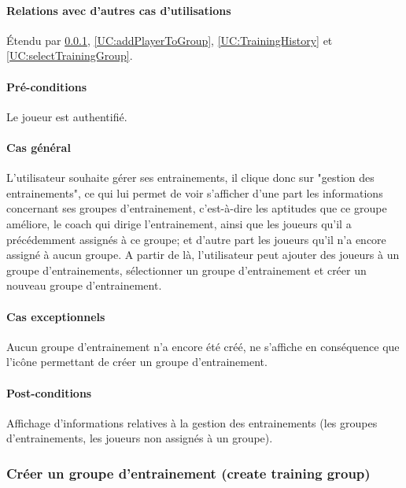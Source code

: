 \paragraph{Relations avec d'autres cas d'utilisations}
Étendu par \ref{UC:createTraining}, \ref{UC:addPlayerToGroup}, \ref{UC:TrainingHistory} et \ref{UC:selectTrainingGroup}.
\paragraph{Pré-conditions}
\begin{list}{}{\leftmargin=1.5em}
\item{Le joueur est authentifié.}
\end{list}
\paragraph{Cas général}
L'utilisateur souhaite gérer ses entrainements, il clique donc sur "gestion des entrainements", ce qui lui permet de voir s'afficher d'une part les informations concernant ses groupes d'entrainement, c'est-à-dire les aptitudes que ce groupe améliore, le coach qui dirige l'entrainement, ainsi que les joueurs qu'il a précédemment assignés à ce groupe; et d'autre part les joueurs qu'il n'a encore assigné à aucun groupe. A partir de là, l'utilisateur peut ajouter des joueurs à un groupe d'entrainements, sélectionner un groupe d'entrainement et créer un nouveau groupe d'entrainement. 
\paragraph{Cas exceptionnels}
Aucun groupe d'entrainement n'a encore été créé, ne s'affiche en conséquence que l'icône permettant de créer un groupe d'entrainement. 
\paragraph{Post-conditions}
\begin{list}{}{\leftmargin=1.5em}
\item{Affichage d'informations relatives à la gestion des entrainements (les groupes d'entrainements, les joueurs non assignés à un groupe).}
\end{list}

\subsubsection{Créer un groupe d'entrainement (create training group)}
\label{UC:createTraining}
